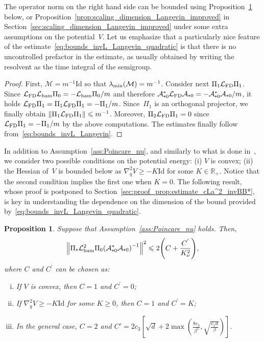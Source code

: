 \documentclass{article}
\newtheorem{prop}{Proposition}
\newcommand{\dps}{\displaystyle }
\newcommand{\cLa}{\mathcal{A}}
\newcommand{\cLham}{\mathcal{L}_{\rm ham}}
\newcommand{\cLFD}{\mathcal{L}_{\rm FD}}
\newcommand{\Id}{\mathrm{Id}}
\newcommand{\subplus}{\textnormal{\texttt{+}}}
\renewcommand{\leq}{\leqslant}
\renewcommand{\geq}{\geqslant}
\begin{document}
The operator norm on the right hand side can be bounded using Proposition~\ref{prop:estimate_cLa^2_invBB*} below, or Proposition~\ref{prop:scaling_dimension_Langevin_improved} in Section~\ref{sec:scaling_dimension_Langevin_improved} under some extra assumptions on the potential~$V$. Let us emphasize that a particularly nice feature of the estimate~\eqref{eq:bounds_invL_Langevin_quadratic} is that there is no uncontrolled prefactor in the estimate, as usually obtained by writing the resolvent as the time integral of the semigroup.

\begin{proof}
  First, $\mathcal{M} = m^{-1} \Id$ so that $\lambda_{\rm min}(\mathcal{M}) = m^{-1}$. Consider next $\Pi_1 \cLFD \Pi_1$. Since $\cLFD \cLham \Pi_0 = -\cLham \Pi_0/m$ and therefore $\cLa_{\subplus 0}^{*}\cLFD \cLa_{\subplus 0} = -\cLa_{\subplus 0}^{*}\cLa_{\subplus 0}/m$, it holds $\cLFD\Pi_1 = \Pi_1 \cLFD \Pi_1= -\Pi_1/m$. Since~$\Pi_1$ is an orthogonal projector, we finally obtain $\left\|\Pi_1 \cLFD \Pi_1\right\| \leq m^{-1}$. Moreover, $\Pi_2 \cLFD \Pi_1 = 0$ since $\cLFD \Pi_1 = -\Pi_1/m$ by the above computations. The estimates finally follow from~\eqref{eq:bounds_invL_Langevin}.
\end{proof}

In addition to Assumption~\ref{ass:Poincare_nu}, and similarly to what is done in~\cite{CLW19}, we consider two possible conditions on the potential energy: (i) $V$ is convex; (ii) the Hessian of~$V$ is bounded below as $\nabla^{2}_{q}V \geq -K \Id$ for some $K \in \mathbb{R}_+$. Notice that the second condition implies the first one when $K = 0$. The following result, whose proof is postponed to Section~\ref{sec:proof_prop:estimate_cLa^2_invBB*}, is key in understanding the dependence on the dimension of the bound provided by~\eqref{eq:bounds_invL_Langevin_quadratic}. 

\begin{prop}
  \label{prop:estimate_cLa^2_invBB*}
  Suppose that Assumption~\ref{ass:Poincare_nu} holds. Then, 
\[
\left\| \Pi_\subplus \cLham^2 \Pi_0 \qty(\cLa_{\subplus 0}^*\cLa_{\subplus 0})^{-1} \right\|^2 \leq 2 \qty(C+\frac{C^{'}}{K_\nu^2}),
\]
where $C$ and $C^{'}$ can be chosen as:
\begin{enumerate}[(i)]
\item If $V$ is convex, then $C=1$ and $C^{'}=0$;
\item If $\nabla_q^2 V \geq -K \Id$ for some $K \geq 0$, then $C=1$ and $C^{'}=K$;
\item In the general case, $C=2$ and $\dps C' = 2c_3\left[\sqrt{d}+2\max\left(\frac{8c_3}{\beta^2},\sqrt{\frac{c_1 d}{\beta}}\right) \right]$.
\end{enumerate}
\end{prop}
\end{document}
